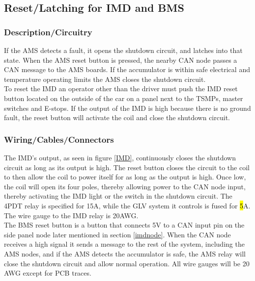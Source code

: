 \documentclass{article}
\DeclareRobustCommand{\hlr}[1]{{\sethlcolor{red}\hl{#1}}}
\begin{document}
    \subsection{Reset/Latching for IMD and BMS}

        \subsubsection{Description/Circuitry}


            If the AMS detects a fault, it opens the shutdown circuit, and latches into that state. When the AMS reset button is pressed, the nearby CAN node passes a CAN message to the AMS boards. If the accumulator is within safe electrical and temperature operating limits the AMS closes the shutdown circuit.\\

           To reset the IMD an operator other than the driver must push the IMD reset button located on the outside of the car on a panel next to the TSMPs, master switches and E-stops. If the output of the IMD is high because there is no ground fault, the reset button will activate the coil and close the shutdown circuit.

        \subsubsection{Wiring/Cables/Connectors}

            The IMD's output, as seen in figure \ref{IMD}, continuously closes the shutdown circuit as long as its output is high. The reset button closes the circuit to the coil to then allow the coil to power itself for as long as the output is high. Once low, the coil will open its four poles, thereby allowing power to the CAN node input, thereby activating the IMD light or the switch in the shutdown circuit. The 4PDT relay is specified for 15A, while the GLV system it controls is fused for \hlr{5}A. The wire gauge to the IMD relay is 20AWG.\\

            The BMS reset button is a button that connects 5V to a CAN input pin on the side panel node later mentioned in section \ref{imdnode}. When the CAN node receives a high signal it sends a message to the rest of the system, including the AMS nodes, and if the AMS detects the accumulator is safe, the AMS relay will close the shutdown circuit and allow normal operation. All wire gauges will be 20 AWG except for PCB traces. \\
\end{document}
